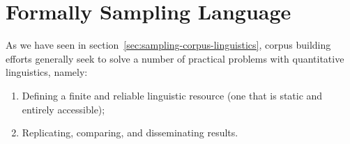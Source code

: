 % 
% 
% 
% 



















\section{Formally Sampling Language}
As we have seen in section~\ref{sec:sampling-corpus-linguistics}, corpus building efforts generally seek to solve a number of practical problems with quantitative linguistics, namely:
\begin{enumerate}
    \item Defining a finite and reliable linguistic resource (one that is static and entirely accessible);
    \item Replicating, comparing, and disseminating results.
\end{enumerate}

